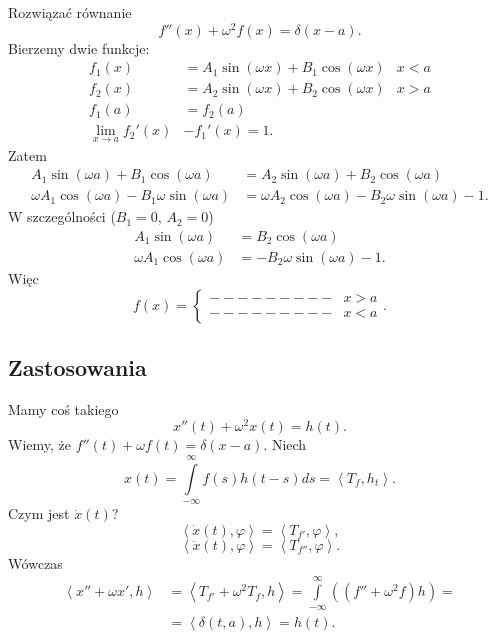\documentclass[../main.tex]{subfiles}
\begin{document}
\begin{przyklad}
    Rozwiązać równanie
    \[
        f''(x) + \omega^2 f(x) = \delta(x-a)
    .\]
Bierzemy dwie funkcje:
\begin{align*}
    f_1(x) &= A_1 \sin(\omega x) + B_1\cos(\omega x) & x < a\\
    f_2(x) &= A_2 \sin(\omega x) + B_2\cos(\omega x) & x > a\\
    f_1(a) &= f_2(a)\\
    \lim_{x \to a} f_2'(x)& - f_1'(x) = 1
.\end{align*}
Zatem
\begin{align*}
    A_1 \sin(\omega a) + B_1 \cos(\omega a) &= A_2 \sin(\omega a) + B_2 \cos(\omega a)\\
    \omega A_1 \cos(\omega a) - B_1 \omega \sin(\omega a) &= \omega A_2 \cos(\omega a) - B_2 \omega \sin (\omega a) - 1
.\end{align*}
    W szczególności ($B_1 = 0$, $A_2 = 0$)
    \begin{align*}
        A_1\sin(\omega a) &= B_2 \cos(\omega a)\\
        \omega A_1 \cos(\omega a) &= -B_2 \omega \sin(\omega a) - 1
    .\end{align*}
    Więc
    \[
        f(x) = \begin{cases}
            --------- & x > a\\
            --------- & x < a
        \end{cases}
    .\]
\end{przyklad}
\subsection{Zastosowania}
Mamy coś takiego
\begin{equation}
    \label{eqn:w24-1}
    x''(t) + \omega^2 x(t) = h(t) \tag{$\star$}.
\end{equation}
Wiemy, że $f''(t) + \omega f(t) = \delta(x-a)$. Niech
\[
    x(t) = \int\limits_{-\infty}^{\infty} f(s)h(t-s)ds =  \left<T_f, h_t \right>
.\]
Czym jest $\dot{x}(t)$?
\[
    \left<\dot{x}(t),\varphi \right> = \left<T_{f'}, \varphi \right>
,\]
\[
    \left<\ddot{x}(t), \varphi \right> = \left<T_{f''}, \varphi \right>
.\]
Wówczas
\begin{align*}
    \left<x'' + \omega x', h \right> &= \left<T_{f'} + \omega^2 T_f, h \right> = \int\limits_{-\infty}^{\infty} \left( (f'' + \omega^2 f)h \right) =\\
    &= \left<\delta(t,a), h \right> = h(t)
.\end{align*}
\end{document}
